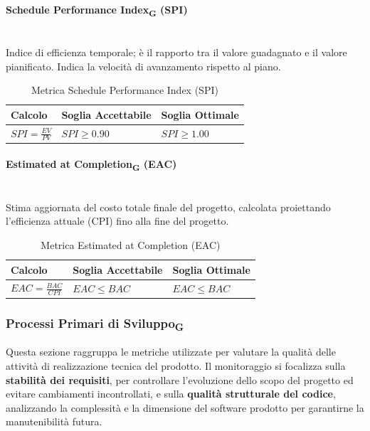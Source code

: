 \documentclass[11pt,a4paper]{article}
\begin{document}
\paragraph{Schedule Performance Index\textsubscript{G} (SPI)} \hfill \\
Indice di efficienza temporale; è il rapporto tra il valore guadagnato e il valore pianificato. Indica la velocità di avanzamento rispetto al piano.

\begin{table}[H]
    \centering
    \renewcommand{\arraystretch}{1.5}
    \begin{tabular}{|M{0.4\textwidth}|M{0.25\textwidth}|M{0.25\textwidth}|}
        \hline
        \textbf{Calcolo} & \textbf{Soglia Accettabile} & \textbf{Soglia Ottimale} \\
        \hline
        $SPI = \frac{EV}{PV}$ & $SPI \ge 0.90$ & $SPI \ge 1.00$ \\
        \hline
    \end{tabular}
    \caption{Metrica Schedule Performance Index (SPI)}
\end{table}

\paragraph{Estimated at Completion\textsubscript{G} (EAC)} \hfill \\
Stima aggiornata del costo totale finale del progetto, calcolata proiettando l'efficienza attuale (CPI) fino alla fine del progetto.

\begin{table}[H]
    \centering
    \renewcommand{\arraystretch}{1.5}
    \begin{tabular}{|M{0.4\textwidth}|M{0.25\textwidth}|M{0.25\textwidth}|}
        \hline
        \textbf{Calcolo} & \textbf{Soglia Accettabile} & \textbf{Soglia Ottimale} \\
        \hline
        $EAC = \frac{BAC}{CPI}$ & $EAC \le BAC$ & $EAC \le BAC$ \\
        \hline
    \end{tabular}
    \caption{Metrica Estimated at Completion (EAC)}
\end{table}

\newpage
\subsubsection{Processi Primari di Sviluppo\textsubscript{G}}
Questa sezione raggruppa le metriche utilizzate per valutare la qualità delle attività di realizzazione tecnica del prodotto.
Il monitoraggio si focalizza sulla \textbf{stabilità dei requisiti}, per controllare l'evoluzione dello scopo del progetto ed evitare cambiamenti incontrollati, e sulla \textbf{qualità strutturale del codice}, analizzando la complessità e la dimensione del software prodotto per garantirne la manutenibilità futura.
\end{document}
